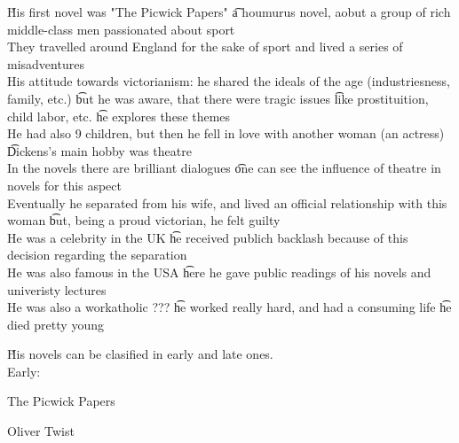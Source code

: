 \documentclass[12pt]{article}
\begin{document}
\v

His first novel was "The Picwick Papers" \t a houmurus novel, aobut a group of rich middle-class men passionated about sport \\
They travelled around England for the sake of sport and lived a series of misadventures \\
His attitude towards victorianism: he shared the ideals of the age (industriesness, family, etc.) \t but he was aware, that there were tragic issues \t like prostituition, child labor, etc. \t he explores these themes \\
He had also 9 children, but then he fell in love with another woman (an actress) \t Dickens's main hobby was theatre \\
In the novels there are brilliant dialogues \t one can see the influence of theatre in novels for this aspect \\
Eventually he separated from his wife, and lived an official relationship with this woman \t but, being a proud victorian, he felt guilty \\
He was a celebrity in the UK \t he received publich backlash because of this decision regarding the separation \\
He was also famous in the USA \t here he gave public readings of his novels and univeristy lectures \\
He was also a workatholic ??? \t he worked really hard, and had a consuming life \t he died pretty young

\v

His novels can be clasified in early and late ones. \\
Early:
\bi 
    \item The Picwick Papers
    \item Oliver Twist
\ei
\end{document}
